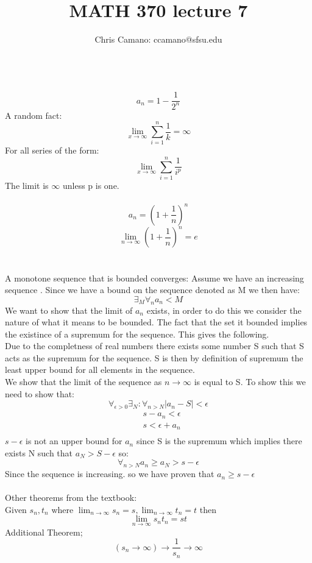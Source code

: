 \documentclass[11pt]{article}
\author{Chris Camano: ccamano@sfsu.edu}
\title{MATH 370  lecture 7 }
\date
\theoremstyle{definition}  %
\newcommand{\xlim}{\lim_{x\rightarrow\infty}}
\begin{document}
\maketitle
   \\
  \[
    a_n=1-\frac{1}{2^n}
  \]
A random fact:
\[
  \xlim \sum_{i=1}^n\frac{1}{k}=\infty
\]
For all series of the form:
\[
  \xlim \sum_{i=1}^n\frac{1}{i^p}
\]
The limit is $\infty$ unless p is one. \\\\

$$a_n=(1+\frac{1}{n})^n$$
\newcommand{\nlim}{\lim_{n\rightarrow \infty}}
\[
  \nlim (1+\frac{1}{n})^n=e
\]\\\\

\theorem
A monotone sequence that is bounded converges: Assume we have an increasing sequence . Since we have a bound on the sequence denoted as M we then have:
\[
  \exists_M \forall_n a_n< M
\]
We want to show that the limit of $a_n$ exists, in order to do this we consider the nature of what it means to be bounded. The fact that the set it bounded implies the existince of a supremum for the sequence. This gives the following. \\
Due to the completness of real numbers there exists some number S such that S acts as the supremum for the sequence. S is then by definition of supremum the least upper bound for all elements in the sequence. \\
We show that the limit of the sequence as $n\rightarrow \infty$ is equal to S. To show this we need to show that:
\[
  \forall_{\epsilon >0}\exists_N:\forall_{n>N}|a_n-S|<\epsilon
\]
\begin{align*}
  &s-a_n<\epsilon\\
  &s<\epsilon+a_n\\
\end{align*}
$s-\epsilon$ is not an
upper bound for $a_n$ since S is the supremum which implies there exists N such that $a_N> S-\epsilon$ so:
\[
  \forall_{n>N}a_n\geq a_N >s-\epsilon
\]
Since the sequence is increasing. so we have proven that $a_n\geq s-\epsilon$\\\\
Other theorems from the textbook:
\\
Given $s_n,t_n$ where $\nlim s_n=s,\nlim t_n=t$ then
\[
  \nlim s_nt_n=st
\]
Additional Theorem;
\[
  (s_n\rightarrow \infty) \rightarrow \frac{1}{s_n}\rightarrow \infty
\]
\end{document}
